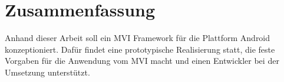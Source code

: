 \thispagestyle{empty}
\section*{Zusammenfassung}
Anhand dieser Arbeit soll ein MVI Framework für die Plattform Android konzeptioniert. Dafür findet eine prototypische Realisierung statt, die feste Vorgaben für die Anwendung vom MVI macht und einen Entwickler bei der Umsetzung unterstützt.